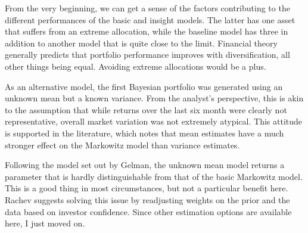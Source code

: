 \documentclass[a4paper]{article}\usepackage[]{graphicx}\usepackage[]{color}
\begin{document}
\begin{table}
    \centering
    \caption{Asset allocations for each of the portfolios in this project. The final three portfolios use Bayesian methods.}
    \label{tab:weights}
\end{table}

From the very beginning, we can get a sense of the factors contributing to the different performances of the basic and insight models. The latter has one asset that suffers from an extreme allocation, while the baseline model has three in addition to another model that is quite close to the limit. Financial theory generally predicts that portfolio performance improves with diversification, all other things being equal. Avoiding extreme allocations would be a plus.

As an alternative model, the first Bayesian portfolio was generated using an unknown mean but a known variance. From the analyst's perspective, this is akin to the assumption that while returns over the last six month were clearly not representative, overall market variation was not extremely atypical. This attitude is supported in the literature, which notes that mean estimates have a much stronger effect on the Markowitz model than variance estimates.

Following the model set out by Gelman, \cite{gelman13} the unknown mean model returns a parameter that is hardly distinguishable from that of the basic Markowitz model. This is a good thing in most circumstances, but not a particular benefit here. Rachev suggests solving this issue by readjusting weights on the prior and the data based on investor confidence. \cite{rachev08} Since other estimation options are available here, I just moved on.
\end{document}
